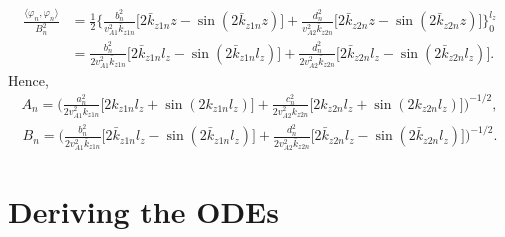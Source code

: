 \documentclass{article}
\begin{document}
\[\begin{aligned}
\frac{\langle \varphi_n, \varphi_n \rangle}{B_n^2} &=
\frac{1}{2}\Bigg\{\frac{b_n^2}{v_{A1}^2\bar{k}_{z1n}}\Big[2\bar{k}_{z1n}z-\sin(2\bar{k}_{z1n}z)\Big]+\frac{d_n^2}{v_{A2}^2\bar{k}_{z2n}}\Big[2\bar{k}_{z2n}z-\sin(2\bar{k}_{z2n}z)\Big]\Bigg\}_0^{l_z} \\
&=\frac{b_n^2}{2v_{A1}^2\bar{k}_{z1n}}\Big[2\bar{k}_{z1n}l_z-\sin(2\bar{k}_{z1n}l_z)\Big]+\frac{d_n^2}{2v_{A2}^2\bar{k}_{z2n}}\Big[2\bar{k}_{z2n}l_z-\sin(2\bar{k}_{z2n}l_z)\Big].
\end{aligned}\]
Hence,
\[\begin{aligned}
A_n = \Bigg(\frac{a_n^2}{2v_{A1}^2k_{z1n}}\Big[2k_{z1n}l_z+\sin(2k_{z1n}l_z)\Big]+\frac{c_n^2}{2v_{A2}^2k_{z2n}}\Big[2k_{z2n}l_z+\sin(2k_{z2n}l_z)\Big]\Bigg)^{-1/2},
\end{aligned}\]
\[\begin{aligned}
B_n = \Bigg(\frac{b_n^2}{2v_{A1}^2\bar{k}_{z1n}}\Big[2\bar{k}_{z1n}l_z-\sin(2\bar{k}_{z1n}l_z)\Big]+\frac{d_n^2}{2v_{A2}^2\bar{k}_{z2n}}\Big[2\bar{k}_{z2n}l_z-\sin(2\bar{k}_{z2n}l_z)\Big]\Bigg)^{-1/2}.
\end{aligned}\]

\section*{Deriving the ODEs}
\end{document}
